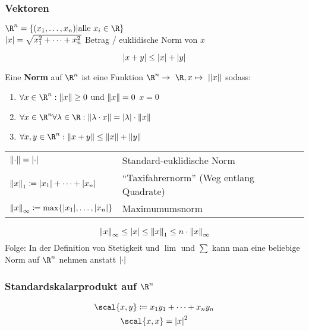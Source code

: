 \subsubsection{Vektoren}
$\R^n = \{ (x_1 , \dotsc , x_n) | \text{alle } x_i \in \R \}$\\
$\abs{x} = \sqrt{x_1^2 + \dots + x_n^2}$ Betrag / euklidische Norm von $x$\\
\begin{satz*}[note = Dreiecksungleichung]
	\[ \abs{x+y} \leq \abs{x} + \abs{y} \]
\end{satz*}
\begin{def*}[note = Norm , index = Norm]
	Eine \textbf{Norm} auf $\R^n$ ist eine Funktion $\R^n \rightarrow \R , x \mapsto ||x||$ sodass:
	\begin{enumerate}
		\item $\forall x \in \R^n : \norm{x} \geq 0$ und $\norm{x} = 0$ \gdw $x=0$
		\item $\forall x \in \R^n \forall \lambda \in \R: \norm{\lambda \cdot x} = \abs{\lambda} \cdot \norm{x}$
		\item $\forall x , y \in \R^n : \norm{x + y} \leq \norm{x} + \norm{y}$
	\end{enumerate}
\end{def*}
\begin{bsp*}
	\begin{tabular}{ll}
		$\norm{\cdot} = \abs{\cdot}$								&Standard-euklidische Norm			\\
		$\norm{x}_1 \coloneqq \abs{x_1} + \dots + \abs{x_n}$				&\enquote{Taxifahrernorm} (Weg entlang Quadrate)	\\
		$\norm{x}_\infty \coloneqq \max\{ \abs{x_1}, \dotsc , \abs{x_n} \}$	&Maximumumsnorm					
	\end{tabular}
\end{bsp*}
\begin{fakt}
	\[ \norm{x}_{\infty} \leq \abs{x} \leq \norm{x}_1 \leq n \cdot \norm{x}_{\infty} \]
	Folge: In der Definition von Stetigkeit und $\lim$ und $\sum$ kann man eine beliebige Norm auf $\R^n$ nehmen anstatt $\abs{\cdot}$
\end{fakt}

\subsubsection{Standardskalarprodukt auf \texorpdfstring{$\R^n$}{R^n}}
\begin{gather*}
	\scal{x,y} \coloneqq x_1 y_1 + \dots + x_n y_n \\
	\scal{x,x} = \abs{x}^2
\end{gather*}
